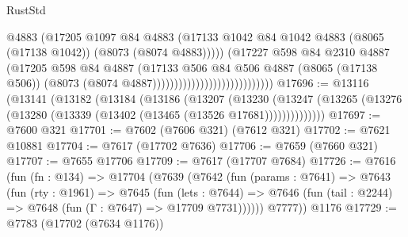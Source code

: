 \begin{lexlean}{RustStd}
\begin{coremodule}
                                                    @4883
                                                    (@17205
                                                      @1097
                                                      @84
                                                      @4883
                                                      (@17133
                                                        @1042
                                                        @84
                                                        @1042
                                                        @4883
                                                        (@8065 (@17138 @1042))
                                                        (@8073 (@8074 @4883)))))
                                                  (@17227
                                                    @598
                                                    @84
                                                    @2310
                                                    @4887
                                                    (@17205
                                                      @598
                                                      @84
                                                      @4887
                                                      (@17133
                                                        @506
                                                        @84
                                                        @506
                                                        @4887
                                                        (@8065 (@17138 @506))
                                                        (@8073
                                                          (@8074 @4887))))))))))))))))))))))))))))
@17696 := @13116
    (@13141
      (@13182
        (@13184
          (@13186
            (@13207
              (@13230
                (@13247 (@13265 (@13276 (@13280 (@13339 (@13402 (@13465 (@13526 @17681))))))))))))))
@17697 := @7600 @321
@17701 := @7602 (@7606 @321) (@7612 @321)
@17702 := @7621 @10881
@17704 := @7617 (@17702 @7636)
@17706 := @7659 (@7660 @321)
@17707 := @7655 @17706
@17709 := @7617 (@17707 @7684)
@17726 := @7616
    (fun (fn : @134) =>
    @17704
      (@7639
        (@7642
          (fun (params : @7641) =>
          @7643
            (fun (rty : @1961) =>
            @7645
              (fun (lets : @7644) =>
              @7646 (fun (tail : @2244) => @7648 (fun (Γ : @7647) => @17709 @7731))))))
        @7777))
    @1176
@17729 := @7783 (@17702 (@7634 @1176))

\end{coremodule}
\end{lexlean}
